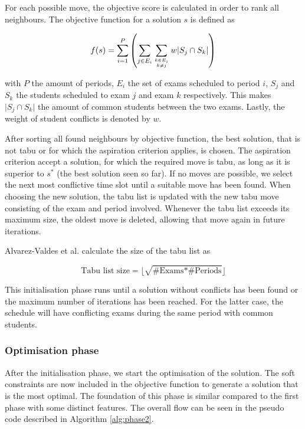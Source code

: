 For each possible move, the objective score is calculated in order to rank all neighbours. The objective function for a solution $s$ is defined as

\begin{equation}
    f(s) = \sum_{i=1}^{P} \left( \sum_{j \in E_i}^{}\sum_{k \in E_i \atop k \neq j}^{}w \lvert S_j \cap S_k \rvert \right)
\end{equation}


with $P$ the amount of periods, $E_i$ the set of exams scheduled to period $i$, $S_j$ and $S_k$ the students scheduled to exam $j$ and exam $k$ respectively. This makes $\lvert S_j \cap S_k \rvert$ the amount of common students between the two exams. Lastly, the weight of student conflicts is denoted by $w$.

After sorting all found neighbours by objective function, the best solution, that is not tabu or for which the aspiration criterion applies, is chosen. The aspiration criterion accept a solution, for which the required move is tabu, as long as it is superior to $s^*$ (the best solution seen so far). If no moves are possible, we select the next most conflictive time slot until a suitable move has been found. When choosing the new solution, the tabu list is updated with the new tabu move consisting of the exam and period involved. Whenever the tabu list exceeds its maximum size, the oldest move is deleted, allowing that move again in future iterations.

Alvarez-Valdes et al. calculate the size of the tabu list as

\begin{equation} \label{eq:list}
    \text{Tabu list size} = \lfloor\sqrt{\text{\# Exams} * \text{\# Periods}}\rfloor
\end{equation}

This initialisation phase runs until a solution without conflicts has been found or the maximum number of iterations has been reached. For the latter case, the schedule will have conflicting exams during the same period with common students.

\subsubsection{Optimisation phase}

After the initialisation phase, we start the optimisation of the solution. The soft constraints are now included in the objective function to generate a solution that is the most optimal. The foundation of this phase is similar compared to the first phase with some distinct features. The overall flow can be seen in the pseudo code described in Algorithm \ref{alg:phase2}.

